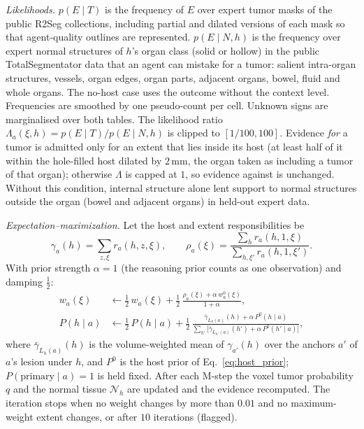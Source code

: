 \documentclass[fleqn,10pt]{olplainarticle}
\begin{document}
\emph{Likelihoods.} $p(E\mid T)$ is the frequency of $E$ over expert tumor masks of the public R2Seg collections, including
partial and dilated versions of each mask so that agent-quality outlines are represented. $p(E\mid N,h)$ is the frequency over
expert normal structures of $h$'s organ class (solid or hollow) in the public TotalSegmentator data that an agent can mistake for a tumor:
salient intra-organ structures, vessels, organ edges, organ parts, adjacent organs, bowel, fluid and whole organs. The no-host
case uses the outcome without the context level. Frequencies are smoothed by one pseudo-count per cell. Unknown signs are marginalised over both tables. The
likelihood ratio $\Lambda_a(\xi,h)=p(E\mid T)/p(E\mid N,h)$ is clipped to $[1/100,100]$. Evidence \emph{for} a tumor is admitted only
for an extent that lies inside its host (at least half of it within the hole-filled host dilated by $2$\,mm, the organ taken as
including a tumor of that organ); otherwise $\Lambda$ is capped at $1$, so evidence against is unchanged. Without this condition,
internal structure alone lent support to normal structures outside the organ (bowel and adjacent organs) in held-out expert
data.

\emph{Expectation--maximization.} Let the host and extent responsibilities be
\begin{equation*}
\gamma_a(h)=\sum_{z,\xi}r_a(h,z,\xi),\qquad
\rho_a(\xi)=\frac{\sum_h r_a(h,1,\xi)}{\sum_{h,\xi'}r_a(h,1,\xi')}.
\end{equation*}
With prior strength $\alpha=1$ (the reasoning prior counts as one observation) and damping $\tfrac12$:
\begin{equation}
\label{eq:mstep}
\begin{aligned}
w_a(\xi)&\leftarrow\tfrac12\,w_a(\xi)+\tfrac12\,\frac{\rho_a(\xi)+\alpha\,w^{0}_a(\xi)}{1+\alpha},\\
P(h\mid a)&\leftarrow\tfrac12\,P(h\mid a)+\tfrac12\,\frac{\bar\gamma_{L_h(a)}(h)+\alpha\,P^{0}(h\mid a)}{\sum_{h'}\bigl[\bar\gamma_{L_{h'}(a)}(h')+\alpha\,P^{0}(h'\mid a)\bigr]},
\end{aligned}
\end{equation}
where $\bar\gamma_{L_h(a)}(h)$ is the volume-weighted mean of $\gamma_{a'}(h)$ over the anchors $a'$ of $a$'s lesion under $h$, and
$P^{0}$ is the host prior of Eq.~\eqref{eq:host_prior}; $P(\text{primary}\mid a)=1$ is held fixed. After each M-step the voxel
tumor probability $q$ and the normal tissue $\mathcal{N}_h$ are updated and the evidence recomputed. The iteration stops when no
weight changes by more than $0.01$ and no maximum-weight extent changes, or after $10$ iterations (flagged).
\end{document}
